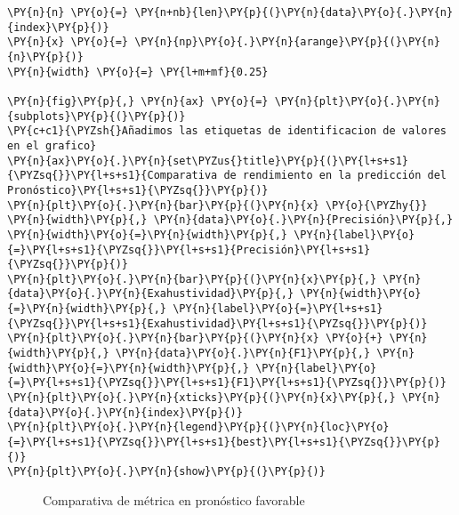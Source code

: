     \begin{tcolorbox}[breakable, size=fbox, boxrule=1pt, pad at break*=1mm,colback=cellbackground, colframe=cellborder]
\begin{Verbatim}[commandchars=\\\{\}]
\PY{n}{n} \PY{o}{=} \PY{n+nb}{len}\PY{p}{(}\PY{n}{data}\PY{o}{.}\PY{n}{index}\PY{p}{)}
\PY{n}{x} \PY{o}{=} \PY{n}{np}\PY{o}{.}\PY{n}{arange}\PY{p}{(}\PY{n}{n}\PY{p}{)}
\PY{n}{width} \PY{o}{=} \PY{l+m+mf}{0.25}

\PY{n}{fig}\PY{p}{,} \PY{n}{ax} \PY{o}{=} \PY{n}{plt}\PY{o}{.}\PY{n}{subplots}\PY{p}{(}\PY{p}{)}
\PY{c+c1}{\PYZsh{}Añadimos las etiquetas de identificacion de valores en el grafico}
\PY{n}{ax}\PY{o}{.}\PY{n}{set\PYZus{}title}\PY{p}{(}\PY{l+s+s1}{\PYZsq{}}\PY{l+s+s1}{Comparativa de rendimiento en la predicción del Pronóstico}\PY{l+s+s1}{\PYZsq{}}\PY{p}{)}
\PY{n}{plt}\PY{o}{.}\PY{n}{bar}\PY{p}{(}\PY{n}{x} \PY{o}{\PYZhy{}} \PY{n}{width}\PY{p}{,} \PY{n}{data}\PY{o}{.}\PY{n}{Precisión}\PY{p}{,} \PY{n}{width}\PY{o}{=}\PY{n}{width}\PY{p}{,} \PY{n}{label}\PY{o}{=}\PY{l+s+s1}{\PYZsq{}}\PY{l+s+s1}{Precisión}\PY{l+s+s1}{\PYZsq{}}\PY{p}{)}
\PY{n}{plt}\PY{o}{.}\PY{n}{bar}\PY{p}{(}\PY{n}{x}\PY{p}{,} \PY{n}{data}\PY{o}{.}\PY{n}{Exahustividad}\PY{p}{,} \PY{n}{width}\PY{o}{=}\PY{n}{width}\PY{p}{,} \PY{n}{label}\PY{o}{=}\PY{l+s+s1}{\PYZsq{}}\PY{l+s+s1}{Exahustividad}\PY{l+s+s1}{\PYZsq{}}\PY{p}{)}
\PY{n}{plt}\PY{o}{.}\PY{n}{bar}\PY{p}{(}\PY{n}{x} \PY{o}{+} \PY{n}{width}\PY{p}{,} \PY{n}{data}\PY{o}{.}\PY{n}{F1}\PY{p}{,} \PY{n}{width}\PY{o}{=}\PY{n}{width}\PY{p}{,} \PY{n}{label}\PY{o}{=}\PY{l+s+s1}{\PYZsq{}}\PY{l+s+s1}{F1}\PY{l+s+s1}{\PYZsq{}}\PY{p}{)}
\PY{n}{plt}\PY{o}{.}\PY{n}{xticks}\PY{p}{(}\PY{n}{x}\PY{p}{,} \PY{n}{data}\PY{o}{.}\PY{n}{index}\PY{p}{)}
\PY{n}{plt}\PY{o}{.}\PY{n}{legend}\PY{p}{(}\PY{n}{loc}\PY{o}{=}\PY{l+s+s1}{\PYZsq{}}\PY{l+s+s1}{best}\PY{l+s+s1}{\PYZsq{}}\PY{p}{)}
\PY{n}{plt}\PY{o}{.}\PY{n}{show}\PY{p}{(}\PY{p}{)}
\end{Verbatim}
\end{tcolorbox}

\begin{center}
    	\begin{figure}[H]
	\centering
	\caption{Comparativa de métrica en pronóstico favorable}
	\label{fig:cmpf}
	\end{figure}
\end{center}
    
